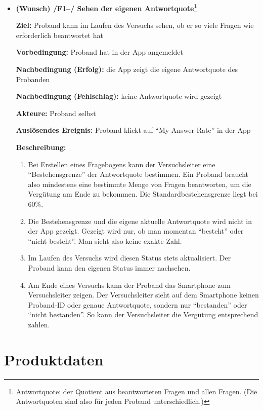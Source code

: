 \documentclass[a4paper]{scrreprt}
\begin{document}
\begin{itemize}
            \item \textbf{(Wunsch) /F1--/ Sehen der eigenen Antwortquote\footnote{Antwortquote: der Quotient aus beantworteten Fragen und allen Fragen. (Die Antwortquoten sind also für jeden Proband unterschiedlich.)}}

            \par \textbf{Ziel: }Proband kann im Laufen des Versuchs sehen, ob er so viele Fragen wie erforderlich beantwortet hat
            \par \textbf{Vorbedingung: }Proband hat in der App angemeldet
            \par \textbf{Nachbedingung (Erfolg): }die App zeigt die eigene Antwortquote des Probanden
            \par \textbf{Nachbedingung (Fehlschlag): }keine Antwortquote wird gezeigt
            \par \textbf{Akteure: }Proband selbst
            \par \textbf{Auslösendes Ereignis: }Proband klickt auf “My Answer Rate” in der App
            \par \textbf{Beschreibung: }
                \begin{enumerate}
                    \item Bei Erstellen eines Fragebogens kann der Versuchsleiter eine “Bestehensgrenze” der Antwortquote bestimmen. Ein Proband braucht also mindestens eine bestimmte Menge von Fragen beantworten, um die Vergütung am Ende zu bekommen. Die Standardbestehensgrenze liegt bei 60\%.
                    \item Die Bestehensgrenze und die eigene aktuelle Antwortquote wird nicht in der App gezeigt. Gezeigt wird nur, ob man momentan “besteht” oder “nicht besteht”. Man sieht also keine exakte Zahl.
                    \item Im Laufen des Versuchs wird diesen Status stets aktualisiert. Der Proband kann den eigenen Status immer nachsehen.
                    \item Am Ende eines Versuchs kann der Proband das Smartphone zum Versuchsleiter zeigen. Der Versuchsleiter sieht auf dem Smartphone keinen Proband-ID oder genaue Antwortquote, sondern nur “bestanden” oder “nicht bestanden”. So kann der Versuchsleiter die Vergütung entsprechend zahlen.
                \end{enumerate}

        \end{itemize}

    \chapter{Produktdaten}
\end{document}
